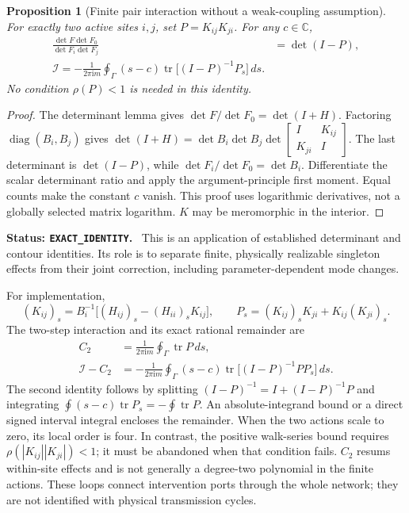 \documentclass[11pt]{article}
\newtheorem{proposition}[theorem]{Proposition}
\newcommand{\diag}{\operatorname{diag}}
\newcommand{\ii}{\mathrm{i}}
\newcommand{\status}[1]{\par\smallskip\noindent\textbf{Status: \texttt{#1}.}\ }
\begin{document}
\begin{proposition}[Finite pair interaction without a weak-coupling assumption]
For exactly two active sites $i,j$, set $P=K_{ij}K_{ji}$. For any $c\in\mathbb C$,
\begin{align}
 \frac{\det F\det F_0}{\det F_i\det F_j}
 &=\det(I-P),\label{eq:pair-determinant}\\
 \boxed{\mathcal I=-\frac{1}{2\pi\ii m}\oint_\Gamma(s-c)
 \operatorname{tr}\big[(I-P)^{-1}P_s\big]\,ds.}\label{eq:pair-rational}
\end{align}
No condition $\rho(P)<1$ is needed in this identity.
\end{proposition}
\begin{proof}
The determinant lemma gives $\det F/\det F_0=\det(I+H)$.
Factoring $\diag(B_i,B_j)$ gives
$\det(I+H)=\det B_i\det B_j\det\left[\begin{smallmatrix}I&K_{ij}\\K_{ji}&I\end{smallmatrix}\right]$.
The last determinant is $\det(I-P)$, while
$\det F_i/\det F_0=\det B_i$. Differentiate the scalar determinant ratio
and apply the argument-principle first moment. Equal counts make the
constant $c$ vanish. This proof uses logarithmic derivatives, not a
globally selected matrix logarithm. $K$ may be meromorphic in the interior.
\end{proof}
\status{EXACT\_IDENTITY}
This is an application of established determinant and contour identities.
Its role is to separate finite, physically realizable singleton effects
from their joint correction, including parameter-dependent mode changes.

For implementation,
\begin{equation}
 (K_{ij})_s=B_i^{-1}\big[(H_{ij})_s-(H_{ii})_sK_{ij}\big],\qquad
 P_s=(K_{ij})_sK_{ji}+K_{ij}(K_{ji})_s.
\end{equation}
The two-step interaction and its exact rational remainder are
\begin{align}
 C_2&=\frac{1}{2\pi\ii m}\oint_\Gamma\operatorname{tr}P\,ds,\\
 \mathcal I-C_2&=-\frac{1}{2\pi\ii m}\oint_\Gamma(s-c)
 \operatorname{tr}\big[(I-P)^{-1}P P_s\big]\,ds.\label{eq:rational-remainder}
\end{align}
The second identity follows by splitting $(I-P)^{-1}=I+(I-P)^{-1}P$
and integrating $\oint(s-c)\operatorname{tr}P_s=-\oint\operatorname{tr}P$.
An absolute-integrand bound or a direct signed interval integral encloses
the remainder. When the two actions scale to zero, its local order is
four. In contrast, the positive walk-series bound requires
$\rho(|K_{ij}||K_{ji}|)<1$; it must be abandoned when that condition fails.
$C_2$ resums within-site effects and is not generally a degree-two polynomial
in the finite actions. These loops connect intervention ports through the
whole network; they are not identified with physical transmission cycles.
\end{document}
